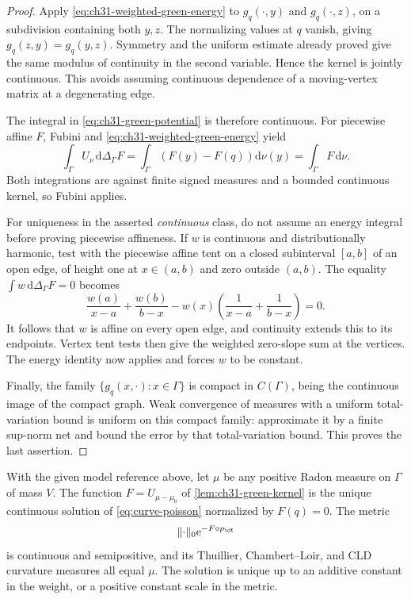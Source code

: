 \begin{proof}
Apply \eqref{eq:ch31-weighted-green-energy} to
\(g_q(\cdot,y)\) and \(g_q(\cdot,z)\), on a subdivision containing
both \(y,z\).  The normalizing values at \(q\) vanish, giving
\(g_q(z,y)=g_q(y,z)\).  Symmetry and the uniform estimate already
proved give the same modulus of continuity in the second variable.
Hence the kernel is jointly continuous.  This avoids assuming
continuous dependence of a moving-vertex matrix at a degenerating edge.

The integral in \eqref{eq:ch31-green-potential} is therefore
continuous.  For piecewise affine \(F\), Fubini and
\eqref{eq:ch31-weighted-green-energy} yield
\[
 \int_\Gamma U_\nu\,\mathrm d\Delta_\Gamma F
  =\int_\Gamma\left(F(y)-F(q)\right)\mathrm d\nu(y)
  =\int_\Gamma F\,\mathrm d\nu.
\]
Both integrations are against finite signed measures and a bounded
continuous kernel, so Fubini applies.

For uniqueness in the asserted \emph{continuous} class, do not assume
an energy integral before proving piecewise affineness.  If \(w\) is
continuous and distributionally harmonic, test with the piecewise
affine tent on a closed subinterval \([a,b]\) of an open edge, of
height one at \(x\in(a,b)\) and zero outside \((a,b)\).
The equality \(\int w\,\mathrm d\Delta_\Gamma F=0\) becomes
\[
 \frac{w(a)}{x-a}+\frac{w(b)}{b-x}
       -w(x)\left(\frac1{x-a}+\frac1{b-x}\right)=0.
\]
It follows that \(w\) is affine on every open edge, and continuity
extends this to its endpoints.  Vertex tent tests then give the
weighted zero-slope sum at the vertices.  The energy identity now
applies and forces \(w\) to be constant.

Finally, the family \(\{g_q(x,\cdot):x\in \Gamma\}\) is compact in
\(C(\Gamma)\), being the continuous image of the compact graph.  Weak
convergence of measures with a uniform total-variation bound is uniform
on this compact family: approximate it by a finite sup-norm net and
bound the error by that total-variation bound.  This proves the last
assertion.
\end{proof}



\begin{proposition}
\label{prop:graph-ma-solution}
With the given model reference above, let \(\mu\) be any positive Radon
measure on \(\Gamma\) of mass \(V\).  The function
\(F=U_{\mu-\mu_0}\) of \cref{lem:ch31-green-kernel} is the unique
continuous solution of \eqref{eq:curve-poisson} normalized by \(F(q)=0\).
The metric
\[
             \lVert\cdot\rVert_0\mathrm e^{-F\circ p_{\cX}}
\]
is continuous and semipositive, and its Thuillier, Chambert--Loir,
and CLD curvature measures all equal \(\mu\).
The solution is unique up to an additive constant in the weight,
or a positive constant scale in the metric.
\end{proposition}

